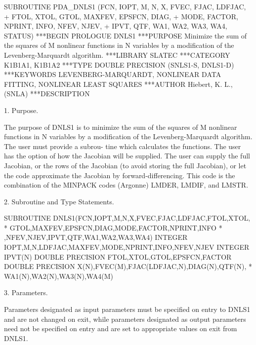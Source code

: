\documentclass[11pt,twoside,nolof]{starlink}
\begin{document}
\begin{terminalv}
      SUBROUTINE PDA_DNLS1 (FCN, IOPT, M, N, X, FVEC, FJAC, LDFJAC,
     +                      FTOL, XTOL, GTOL, MAXFEV, EPSFCN, DIAG,
     +                      MODE, FACTOR, NPRINT, INFO, NFEV, NJEV,
     +                      IPVT, QTF, WA1, WA2, WA3, WA4, STATUS)
***BEGIN PROLOGUE  DNLS1
***PURPOSE  Minimize the sum of the squares of M nonlinear functions
            in N variables by a modification of the Levenberg-Marquardt
            algorithm.
***LIBRARY   SLATEC
***CATEGORY  K1B1A1, K1B1A2
***TYPE      DOUBLE PRECISION (SNLS1-S, DNLS1-D)
***KEYWORDS  LEVENBERG-MARQUARDT, NONLINEAR DATA FITTING,
             NONLINEAR LEAST SQUARES
***AUTHOR  Hiebert, K. L., (SNLA)
***DESCRIPTION

 1. Purpose.

       The purpose of DNLS1 is to minimize the sum of the squares of M
       nonlinear functions in N variables by a modification of the
       Levenberg-Marquardt algorithm.  The user must provide a subrou-
       tine which calculates the functions.  The user has the option
       of how the Jacobian will be supplied.  The user can supply the
       full Jacobian, or the rows of the Jacobian (to avoid storing
       the full Jacobian), or let the code approximate the Jacobian by
       forward-differencing.   This code is the combination of the
       MINPACK codes (Argonne) LMDER, LMDIF, and LMSTR.


 2. Subroutine and Type Statements.

       SUBROUTINE DNLS1(FCN,IOPT,M,N,X,FVEC,FJAC,LDFJAC,FTOL,XTOL,
      *                 GTOL,MAXFEV,EPSFCN,DIAG,MODE,FACTOR,NPRINT,INFO
      *                 ,NFEV,NJEV,IPVT,QTF,WA1,WA2,WA3,WA4)
       INTEGER IOPT,M,N,LDFJAC,MAXFEV,MODE,NPRINT,INFO,NFEV,NJEV
       INTEGER IPVT(N)
       DOUBLE PRECISION FTOL,XTOL,GTOL,EPSFCN,FACTOR
       DOUBLE PRECISION X(N),FVEC(M),FJAC(LDFJAC,N),DIAG(N),QTF(N),
      *     WA1(N),WA2(N),WA3(N),WA4(M)


 3. Parameters.

       Parameters designated as input parameters must be specified on
       entry to DNLS1 and are not changed on exit, while parameters
       designated as output parameters need not be specified on entry
       and are set to appropriate values on exit from DNLS1.


\end{terminalv}
\end{document}
